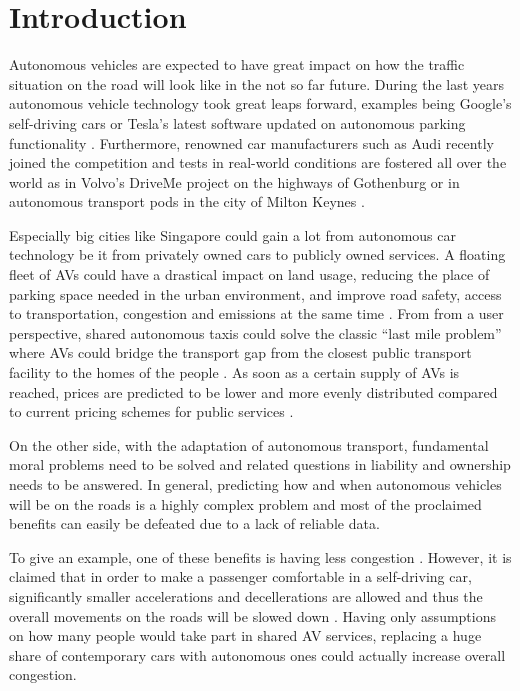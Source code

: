 \section{Introduction}

Autonomous vehicles are expected to have great impact on how the traffic situation
on the road will look like in the not so far future. During the last years autonomous
vehicle technology took great leaps forward, examples being Google's self-driving cars
\citep{Google2016} or Tesla's latest software updated on autonomous parking functionality \citep{Tesla2016}.
Furthermore, renowned car manufacturers such as Audi recently joined the competition
and tests in real-world conditions are fostered all over the world as in Volvo's
DriveMe \citep{Gothenburg2016} project on the highways of Gothenburg or in autonomous transport pods
in the city of Milton Keynes \citep{MiltonKeynes2016}.

Especially big cities like Singapore could gain a lot from autonomous car technology
be it from privately owned cars to publicly owned services. A floating fleet of
AVs could have a drastical impact on land usage, reducing the place of parking
space needed in the urban environment, and improve road safety, access to transportation,
congestion and emissions at the same time \citep{Kheong2014}.
From from a user perspective, shared autonomous taxis could solve the classic ``last mile problem'' where AVs could
bridge the transport gap from the closest public transport facility to the homes
of the people \citep{Litman2014}. As soon as a certain supply of AVs is reached, prices are predicted
to be lower and more evenly distributed compared to current pricing schemes for
public services \citep{Chen16}.

On the other side, with the adaptation of autonomous transport, fundamental moral
problems \citep{Hevelke2015a} need to be solved and related questions in liability and
ownership needs to be answered. In general, predicting how and when autonomous
vehicles will be on the roads is a highly complex problem and most of the proclaimed
benefits can easily be defeated due to a lack of reliable data.

To give an example, one of these benefits is having less congestion \citep{Litman2014}. However,
it is claimed that in order to make a passenger comfortable in a self-driving car,
significantly smaller accelerations and decellerations are allowed and thus the
overall movements on the roads will be slowed down \citep{LeVine2015}. Having only assumptions
on how many people would take part in shared AV services, replacing a huge share of
contemporary cars with autonomous ones could actually increase overall congestion.

